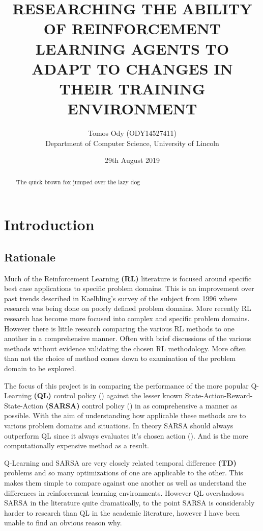\documentclass[10pt,journal]{IEEEtran}
\title{\textbf{RESEARCHING THE ABILITY OF REINFORCEMENT LEARNING AGENTS TO ADAPT TO CHANGES IN THEIR TRAINING ENVIRONMENT}\\}
\author{Tomos Ody (ODY14527411)\\Department of Computer Science, University of Lincoln}
\date{29th August 2019}
\begin{document}
\maketitle

\begin{abstract}
  The quick brown fox jumped over the lazy dog \lipsum[1]
\end{abstract}

\section{Introduction}

\subsection{Rationale}
Much of the Reinforcement Learning \textbf{(RL)} literature is focused around specific best case applications to specific problem domains. This is an improvement over past trends described in Kaelbling's survey of the subject from 1996 \cite{Kaelbling} where research was being done on poorly defined problem domains. More recently RL research has become more focused into complex and specific problem domains. However there is little research comparing the various RL methods to one another in a comprehensive manner. Often with brief discussions of the various methods without evidence validating the chosen RL methodology. More often than not the choice of method comes down to examination of the problem domain to be explored.

The focus of this project is in comparing the performance of the more popular Q-Learning \textbf{(QL)}  control policy (\cite{Watkins}) against the lesser known State-Action-Reward-State-Action \textbf{(SARSA)} control policy (\cite{Rummery}) in as comprehensive a manner as possible. With the aim of understanding how applicable these methods are to various problem domains and situations. In theory SARSA should always outperform QL since it always evaluates it’s chosen action (\cite{Sutton}). And is the more computationally expensive method as a result.

Q-Learning and SARSA are very closely related temporal difference \textbf{(TD)} problems and so many optimizations of one are applicable to the other. This makes them simple to compare against one another as well as understand the differences in reinforcement learning environments. However QL overshadows SARSA in the literature quite dramatically, to the point SARSA is considerably harder to research than QL in the academic literature, however I have been unable to find an obvious reason why.
\end{document}
